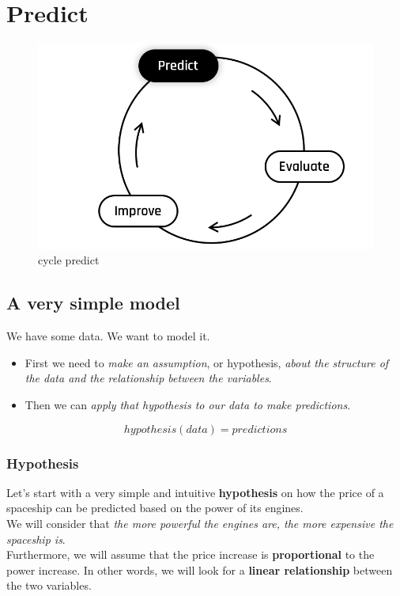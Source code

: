 \section*{Predict}

\begin{figure}[h!]
  \centering
  \includegraphics[scale=0.25]{assets/Predict.png}
  \caption{cycle predict}
\end{figure}

\subsection*{A very simple model}

We have some data. We want to model it.  
\begin{itemize}
    \item First we need to \textit{make an assumption}, or hypothesis, \textit{about the structure of the data and the relationship between the variables}.  
    \item Then we can \textit{apply that hypothesis to our data to make predictions}.
\end{itemize}

$$
hypothesis(data) = predictions
$$

\subsubsection*{Hypothesis}
Let's start with a very simple and intuitive \textbf{hypothesis} on how the price of a spaceship can be predicted based on the power of its engines.\\
We will consider that \textit{the more powerful the engines are, the more expensive the spaceship is}.\\
Furthermore, we will assume that the price increase is \textbf{proportional} to the power increase. In other words, we will look for a \textbf{linear relationship} between the two variables.

